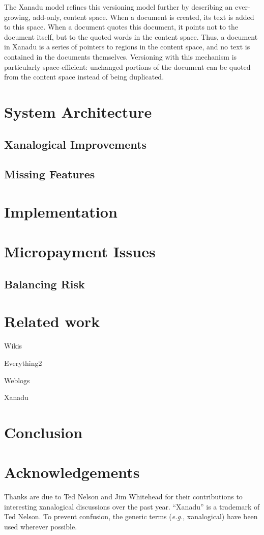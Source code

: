 \documentclass{acm_proc_article-sp}
\begin{document}
The Xanadu model refines this versioning model further by describing an ever-growing, add-only, content space.  
When a document is created, its text is added to this space.
When a document quotes this document, it points not to the document itself, but to the quoted words in the content space.
Thus, a document in Xanadu is a series of pointers to regions in the content space, and no text is contained in the documents themselves.
Versioning with this mechanism is particularly space-efficient:  unchanged portions of the document can be quoted from the content space instead of being duplicated.



\section{System Architecture}


\subsection{Xanalogical Improvements}


\subsection{Missing Features}


\section{Implementation}


\section{Micropayment Issues}


\subsection{Balancing Risk}



\section{Related work}

Wikis
\cite{WikiWikiWeb}
\cite{Wikipedia}

Everything2
\cite{Everything2}

Weblogs
\cite{kuro5hin}

Xanadu

\section{Conclusion}


\section{Acknowledgements}
Thanks are due to Ted Nelson and Jim Whitehead for their contributions to interesting xanalogical discussions over the past year. ``Xanadu'' is a trademark of Ted Nelson.  To prevent confusion, the generic terms ({\it e.g.}, xanalogical) have been used wherever possible.



\end{document}
